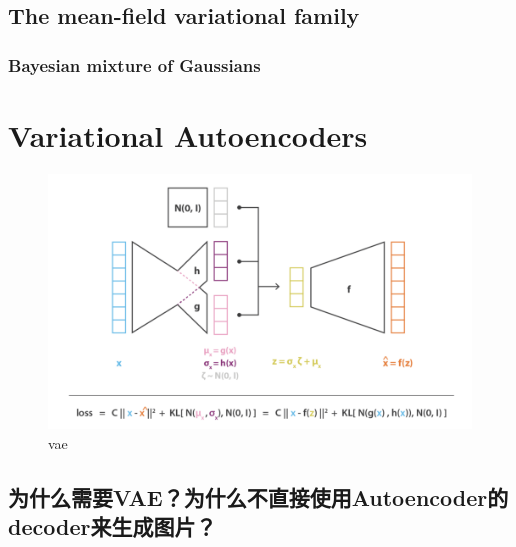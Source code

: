 \subsection{The mean-field variational family}
\subsubsection{Bayesian mixture of Gaussians}

\section{Variational Autoencoders}
\begin{figure}[H]
    \centering
    \includegraphics[width=12cm]{images/vae.png}
    \caption{vae}
    \label{fig:VAE}
\end{figure}
\subsection{为什么需要VAE？为什么不直接使用Autoencoder的decoder来生成图片？}

